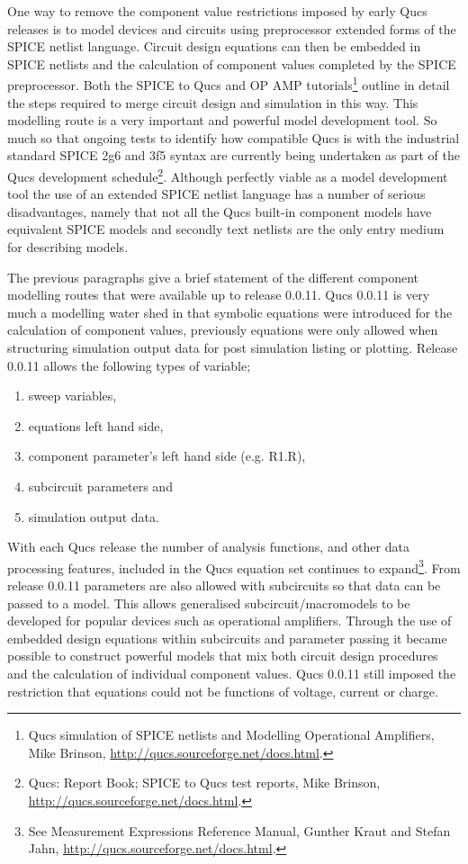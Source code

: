 One way to remove the component value restrictions imposed by early
Qucs releases is to model devices and circuits using preprocessor
extended forms of the SPICE netlist language. Circuit design equations
can then be embedded in SPICE netlists and the calculation of
component values completed by the SPICE preprocessor. Both the SPICE
to Qucs and OP AMP tutorials\footnote{Qucs simulation of SPICE
netlists and Modelling Operational Amplifiers, Mike Brinson,
\url{http://qucs.sourceforge.net/docs.html}.} outline in detail the steps
required to merge circuit design and simulation in this way.  This
modelling route is a very important and powerful model development
tool. So much so that ongoing tests to identify how compatible Qucs is
with the industrial standard SPICE 2g6 and 3f5 syntax are currently
being undertaken as part of the Qucs development
schedule\footnote{Qucs: Report Book; SPICE to Qucs test reports, Mike
Brinson, \url{http://qucs.sourceforge.net/docs.html}.}. Although perfectly
viable as a model development tool the use of an extended SPICE
netlist language has a number of serious disadvantages, namely that
not all the Qucs built-in component models have equivalent SPICE
models and secondly text netlists are the only entry medium for
describing models.

\vspace{5mm} 

The previous paragraphs give a brief statement of the different
component modelling routes that were available up to release
0.0.11. Qucs 0.0.11 is very much a modelling water shed in that
symbolic equations were introduced for the calculation of component
values, previously equations were only allowed when structuring
simulation output data for post simulation listing or
plotting. Release 0.0.11 allows the following types of variable;
\begin{enumerate}
\item sweep variables,
\item equations left hand side,
\item component parameter's left hand side (e.g. R1.R),
\item subcircuit parameters and
\item simulation output data.
\end{enumerate}
With each Qucs release the number of
analysis functions, and other data processing features, included in
the Qucs equation set continues to expand\footnote{See Measurement
Expressions Reference Manual, Gunther Kraut and Stefan Jahn,
\url{http://qucs.sourceforge.net/docs.html}.}. From release 0.0.11
parameters are also allowed with subcircuits so that data can be
passed to a model. This allows generalised subcircuit/macromodels to
be developed for popular devices such as operational amplifiers.
Through the use of embedded design equations within subcircuits and
parameter passing it became possible to construct powerful models that
mix both circuit design procedures and the calculation of individual
component values.  Qucs 0.0.11 still imposed the restriction that
equations could not be functions of voltage, current or charge.




